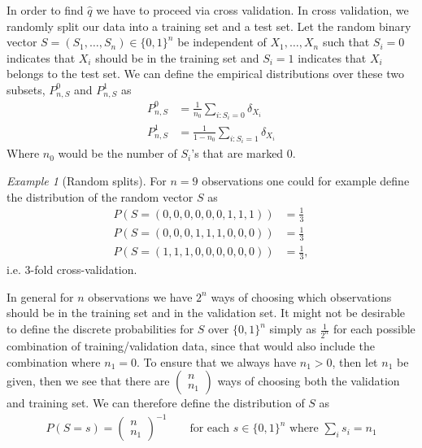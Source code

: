 \documentclass[11pt, a4paper]{article}
\theoremstyle{definition}
\theoremstyle{remark}
\newtheorem{example}{Example}
\newcommand{\cl}{q}
\begin{document}
In order to find $ \hat{\cl}  $ we have to proceed via cross validation. In cross validation, we randomly split our data into a training set and a test set. Let the random binary vector $ S = (S_1,\ldots,S_n) \in \{0,1\}^{n} $ be independent of $ X_1,\ldots, X_n $ such that $ S_i = 0 $ indicates that $ X_i $ should be in the training set and $ S_i = 1 $ indicates that $ X_i $ belongs to the test set. We can define the empirical distributions over these two subsets, $ P_{n,S}^0$ and $ P_{n,S}^{1} $ as
\begin{align*}
    P_{n,S}^{0} &= \frac{1}{n_0} \sum_{i: S_i = 0} \delta_{X_i} \\
    P_{n,S}^{1} &= \frac{1}{1-n_0} \sum_{i: S_i = 1} \delta_{X_i} 
\end{align*}
Where $ n_0 $ would be the number of $ S_i $'s that are marked $ 0 $. 

\begin{example}[Random splits]
    For $ n = 9 $ observations one could for example define the distribution of the random vector $ S $ as 
   \begin{align*}
       P(S = (0, 0, 0, 0, 0, 0, 1, 1, 1)) &= \frac{1}{3} \\
       P(S = (0, 0, 0, 1, 1, 1, 0, 0, 0)) &= \frac{1}{3} \\
       P(S = (1, 1, 1, 0, 0, 0, 0, 0, 0)) &= \frac{1}{3},
   \end{align*}
    i.e. 3-fold cross-validation.

    In general for $ n $ observations we have $ 2^{n} $ ways of choosing which observations should be in the training set and in the validation set. It might not be desirable to define the discrete probabilities for $ S $ over $ \{0,1\}^{n} $ simply as $ \frac{1}{2^{n}} $ for each possible combination of training/validation data, since that would also include the combination where $ n_1 = 0 $. To ensure that we always have $ n_1 > 0 $, then let $ n_1 $ be given, then we see that there are $ \begin{pmatrix}
        n \\ n_1
    \end{pmatrix}$ ways of choosing both the validation and training set. We can therefore define the distribution of $ S $ as 
    \begin{align*}
        P \left(S = s \right) = \begin{pmatrix}
            n \\ n_1
    \end{pmatrix}^{-1} \qquad \text{for each } s \in \{0,1\}^{n} \text{ where } \sum_{i} s_i = n_1
    \end{align*}

\end{example}
\end{document}
